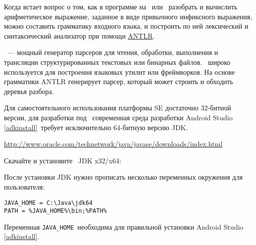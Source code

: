\secdown


Когда встает вопрос о том, как в программе на \java\ или \cs\ разобрать и 
вычислить арифметическое выражение, заданное в
виде привычного инфиксного выражения, можно составить грамматику 
входного языка, и построить по ней лексический и синтаксический 
анализатор при помощи \href{http://www.antlr.org/}{ANTLR}.

\begin{framed}
\ --- мощный генератор
парсеров для чтения, обработки, выполнения и трансляции
структурированных текстовых или бинарных файлов. \ широко 
используется для построения языковых утилит или фреймворков. На основе 
грамматики ANTLR генерирует парсер, который может строить и обходить 
деревья разбора.
\end{framed}

\secdown


Для самостоятельного использования платформы \java SE достаточно
32-битной версии, для разработки под \andr\ современная среда разработки Android 
Studio \ref{adkinstall}\ требует исключительно 64-битную версию JDK.

\bigskip
\url{http://www.oracle.com/technetwork/java/javase/downloads/index.html}
\bigskip

Скачайте и установите \java\ JDK x32/x64:





\bigskip
После установки JDK нужно прописать несколько переменных окружения для 
пользователя:

\begin{verbatim}
JAVA_HOME = C:\Java\jdk64
PATH = %JAVA_HOME%\bin;%PATH%
\end{verbatim}

Переменная \verb|JAVA_HOME|\ необходима для правильной установки
Android Studio \ref{adkinstall}.


